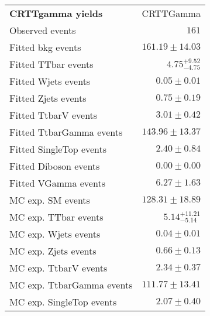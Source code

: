 

\begin{table}[!h]
\begin{center}
\setlength{\tabcolsep}{0.0pc}
{\small
\begin{tabular*}{\textwidth}{@{\extracolsep{\fill}}lr}
\noalign{\smallskip}\hline\noalign{\smallskip}
{\bf CRTTgamma yields}           & CRTTGamma              \\[-0.05cm]
\noalign{\smallskip}\hline\noalign{\smallskip}
Observed events          & $161$                    \\
\noalign{\smallskip}\hline\noalign{\smallskip}
Fitted bkg events         & $161.19 \pm 14.03$              \\
\noalign{\smallskip}\hline\noalign{\smallskip}
        Fitted TTbar events         & $4.75_{-4.75}^{+9.52}$              \\
        Fitted Wjets events         & $0.05 \pm 0.01$              \\
        Fitted Zjets events         & $0.75 \pm 0.19$              \\
        Fitted TtbarV events         & $3.01 \pm 0.42$              \\
        Fitted TtbarGamma events         & $143.96 \pm 13.37$              \\
        Fitted SingleTop events         & $2.40 \pm 0.84$              \\
        Fitted Diboson events         & $0.00 \pm 0.00$              \\
        Fitted VGamma events         & $6.27 \pm 1.63$              \\
 \noalign{\smallskip}\hline\noalign{\smallskip}
MC exp. SM events              & $128.31 \pm 18.89$              \\
\noalign{\smallskip}\hline\noalign{\smallskip}
        MC exp. TTbar events         & $5.14_{-5.14}^{+11.21}$              \\
        MC exp. Wjets events         & $0.04 \pm 0.01$              \\
        MC exp. Zjets events         & $0.66 \pm 0.13$              \\
        MC exp. TtbarV events         & $2.34 \pm 0.37$              \\
        MC exp. TtbarGamma events         & $111.77 \pm 13.41$              \\
        MC exp. SingleTop events         & $2.07 \pm 0.40$              \\

\end{tabular*}}
\end{center}
\end{table}
